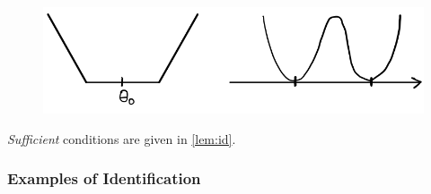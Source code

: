 \documentclass[../main.tex]{subfiles}
\begin{document}
	\begin{figure}[h]
         \centering
         \label{fig:badQ}
         \includegraphics[scale=0.4]{wk1/1.jpg}  
    \end{figure} 

  \emph{Sufficient} conditions are given in \cref{lem:id}.

\subsubsection{Examples of Identification}
\end{document}
